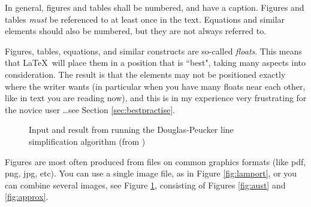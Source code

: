 In general, figures and tables shall be numbered, and have a caption. Figures and tables {\em must} be referenced to at least once in the text. Equations and similar elements should also be numbered, but they are not always referred to.

Figures, tables, equations, and similar constructs are so-called {\em floats}. This means that  \LaTeX\ will place them in a position that is ``best", taking many aspects into consideration. The result is that the elements may not be positioned exactly where the writer wants (in particular when you have many floats near each other, like in text you are reading now), and this is in my experience very frustrating for the novice user \dots see Section \ref{sec:bestpractise}.


\begin{figure}[!h]
  \begin{center}
  \end{center}
  \caption{Input and result from running the Douglas-Peucker line simplification algorithm \cite{douglas73afr} (from \cite{kjeldsen05cor})}
  \label{fig:dpaustralia}
\end{figure}

Figures are most often produced from files on common graphics formats (like pdf, png, jpg, etc). You can use a single image file, as in Figure \ref{fig:lamport}, or
you can combine several images, see Figure \ref{fig:dpaustralia}, consisting of Figures \ref{fig:aust} and \ref{fig:approx}.


